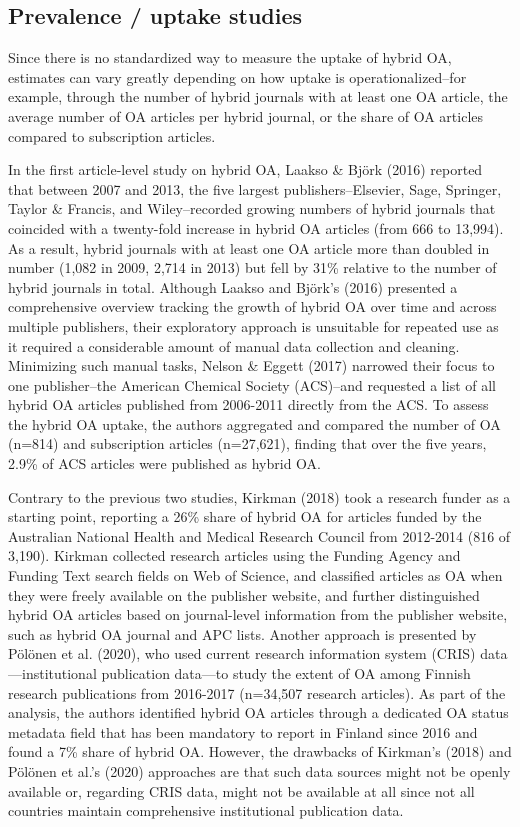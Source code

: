 \documentclass[a4paper,man,floatsintext,longtable,noextraspace,12pt]{apa6}
\begin{document}
\hypertarget{prevalence-uptake-studies}{%
\subsection{Prevalence / uptake
studies}\label{prevalence-uptake-studies}}

Since there is no standardized way to measure the uptake of hybrid OA,
estimates can vary greatly depending on how uptake is
operationalized--for example, through the number of hybrid journals with
at least one OA article, the average number of OA articles per hybrid
journal, or the share of OA articles compared to subscription articles.

In the first article-level study on hybrid OA, Laakso \& Björk (2016)
reported that between 2007 and 2013, the five largest
publishers--Elsevier, Sage, Springer, Taylor \& Francis, and
Wiley--recorded growing numbers of hybrid journals that coincided with a
twenty-fold increase in hybrid OA articles (from 666 to 13,994). As a
result, hybrid journals with at least one OA article more than doubled
in number (1,082 in 2009, 2,714 in 2013) but fell by 31\% relative to
the number of hybrid journals in total. Although Laakso and Björk's
(2016) presented a comprehensive overview tracking the growth of hybrid
OA over time and across multiple publishers, their exploratory approach
is unsuitable for repeated use as it required a considerable amount of
manual data collection and cleaning. Minimizing such manual tasks,
Nelson \& Eggett (2017) narrowed their focus to one publisher--the
American Chemical Society (ACS)--and requested a list of all hybrid OA
articles published from 2006-2011 directly from the ACS. To assess the
hybrid OA uptake, the authors aggregated and compared the number of OA
(n=814) and subscription articles (n=27,621), finding that over the five
years, 2.9\% of ACS articles were published as hybrid OA.

Contrary to the previous two studies, Kirkman (2018) took a research
funder as a starting point, reporting a 26\% share of hybrid OA for
articles funded by the Australian National Health and Medical Research
Council from 2012-2014 (816 of 3,190). Kirkman collected research
articles using the Funding Agency and Funding Text search fields on Web
of Science, and classified articles as OA when they were freely
available on the publisher website, and further distinguished hybrid OA
articles based on journal-level information from the publisher website,
such as hybrid OA journal and APC lists. Another approach is presented
by Pölönen et al. (2020), who used current research information system
(CRIS) data---institutional publication data---to study the extent of OA
among Finnish research publications from 2016-2017 (n=34,507 research
articles). As part of the analysis, the authors identified hybrid OA
articles through a dedicated OA status metadata field that has been
mandatory to report in Finland since 2016 and found a 7\% share of
hybrid OA. However, the drawbacks of Kirkman's (2018) and Pölönen et
al.'s (2020) approaches are that such data sources might not be openly
available or, regarding CRIS data, might not be available at all since
not all countries maintain comprehensive institutional publication data.
\end{document}
